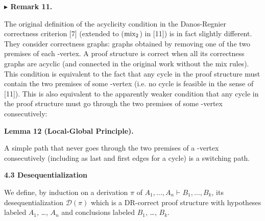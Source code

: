 \documentclass[10pt,a4paper]{amsart}
\begin{document}
 
 
\par\medskip\noindent\textbf{$\blacktriangleright$ Remark 11.}\par
 
 
The original definition of the acyclicity condition in the Danos-Regnier correctness criterion [7] (extended to ($\textnormal{{mix}}_{2}$) in [11]) is in fact slightly different. They consider correctness graphs: graphs obtained by removing one of the two premises of each -vertex. A proof structure is correct when all its correctness graphs are acyclic (and connected in the original work without the mix rules). This condition is equivalent to the fact that any cycle in the proof structure must contain the two premises of some -vertex (i.e. no cycle is feasible in the sense of [11]). This is also equivalent to the apparently weaker condition that any cycle in the proof structure must go through the two premises of some -vertex consecutively:\par
 
 
 
 
\par\medskip\noindent\textbf{Lemma 12 (Local-Global Principle).}\par
 
 
A simple path that never goes through the two premises of a -vertex consecutively (including as last and first edges for a cycle) is a switching path.\par
 
 
 
 
 
\par\medskip\noindent\textbf{4.3 Desequentialization}\par
 
 
We define, by induction on a derivation $\pi$ of $A_{1},\dotsc,A_{n}\vdash B_{1},\dotsc,B_{k}$, its desequentialization $\mathcal{D}(\pi)$ which is a DR-correct proof structure with hypotheses labeled $A_{1}$, …, $A_{n}$ and conclusions labeled $B_{1}$, …, $B_{k}$.\par
  
\end{document}
